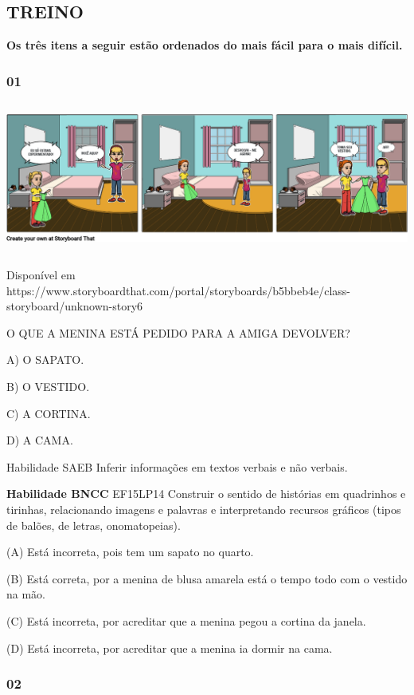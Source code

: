 \subsection{TREINO}\label{treino-6}

\textbf{Os três itens a seguir estão ordenados do mais fácil para o mais
difícil. }

\subsubsection{01 }\label{section-23}

\includegraphics[width=5.90556in,height=1.95278in]{media/image180.png}

Disponível em
https://www.storyboardthat.com/portal/storyboards/b5bbeb4e/class-storyboard/unknown-story6

O QUE A MENINA ESTÁ PEDIDO PARA A AMIGA DEVOLVER?

A) O SAPATO.

B) O VESTIDO.

C) A CORTINA.

D) A CAMA.

Habilidade SAEB Inferir informações em textos verbais e não verbais.

\textbf{Habilidade BNCC} EF15LP14 Construir o sentido de histórias em
quadrinhos e tirinhas, relacionando imagens e palavras e interpretando
recursos gráficos (tipos de balões, de letras, onomatopeias).

(A) Está incorreta, pois tem um sapato no quarto.

(B) Está correta, por a menina de blusa amarela está o tempo todo com o
vestido na mão.

(C) Está incorreta, por acreditar que a menina pegou a cortina da janela.

(D) Está incorreta, por acreditar que a menina ia dormir na cama.

\subsubsection{02 }\label{section-24}

